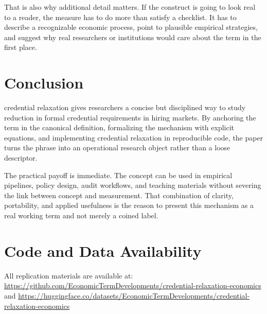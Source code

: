 \documentclass[12pt]{article}
\begin{document}
That is also why additional detail matters. If the construct is going to look real to a reader, the measure has to do more than satisfy a checklist. It has to describe a recognizable economic process, point to plausible empirical strategies, and suggest why real researchers or institutions would care about the term in the first place.

\section{Conclusion}
credential relaxation gives researchers a concise but disciplined way to study reduction in formal credential requirements in hiring markets. By anchoring the term in the canonical definition, formalizing the mechanism with explicit equations, and implementing credential relaxation in reproducible code, the paper turns the phrase into an operational research object rather than a loose descriptor.

The practical payoff is immediate. The concept can be used in empirical pipelines, policy design, audit workflows, and teaching materials without severing the link between concept and measurement. That combination of clarity, portability, and applied usefulness is the reason to present this mechanism as a real working term and not merely a coined label.

\section*{Code and Data Availability}
All replication materials are available at:
\url{https://github.com/EconomicTermDevelopments/credential-relaxation-economics} and
\url{https://huggingface.co/datasets/EconomicTermDevelopments/credential-relaxation-economics}
\end{document}
